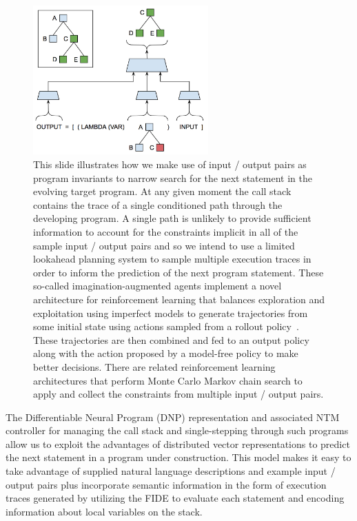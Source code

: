 \documentclass[letterpaper,11pt]{article}
\def\urlh#1{{}}
\begin{document}
\begin{figure}
%
  \begin{center} 
    \includegraphics[width=2.65in]{./figures/Differentiable_Program_Emulation.jpg} %
  \end{center}
%
  \caption{This slide illustrates how we make use of input / output pairs as program invariants to narrow search for the next statement in the evolving target program. At any given moment the call stack contains the trace of a single conditioned path through the developing program. A single path is unlikely to provide sufficient information to account for the constraints implicit in all of the sample input / output pairs and so we intend to use a limited lookahead planning system to sample multiple execution traces in order to inform the prediction of the next program statement. 
%
These so-called imagination-augmented agents implement a novel architecture for reinforcement learning that balances exploration and exploitation using imperfect models to generate trajectories from some initial state using actions sampled from a rollout policy~\cite{PascanuetalCoRR-17,WeberetalCoRR-17,HamricketalCoRR-17,GuezetalCoRR-18}. These trajectories are then combined and fed to an output policy along with the action proposed by a model-free policy to make better decisions. There are related reinforcement learning architectures that perform Monte Carlo Markov chain search to apply and collect the constraints from multiple input / output pairs.}
%
  \label{fig_emulator}
%
\end{figure}


The Differentiable Neural Program (DNP) representation and associated NTM controller for managing the call stack and single-stepping through such programs allow us to exploit the advantages of distributed vector representations to predict the next statement in a program under construction. This model makes it easy to take advantage of supplied natural language descriptions and example input / output pairs plus incorporate semantic information in the form of execution traces generated by utilizing the FIDE to evaluate each statement and encoding information about local variables on the stack.
\end{document}
